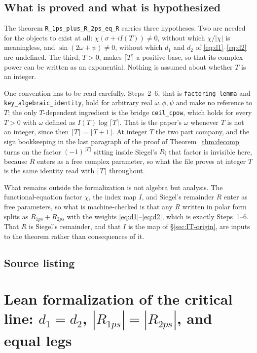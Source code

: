 \documentclass[11pt]{article}
\theoremstyle{definition}
\begin{document}
\subsection{What is proved and what is hypothesized}

The theorem \texttt{R\_1ps\_plus\_R\_2ps\_eq\_R} carries three hypotheses. Two are
needed for the objects to exist at all: $\chi(\sigma+iI(T))\neq0$, without which
$\chi/|\chi|$ is meaningless, and $\sin(2\omega+\psi)\neq0$, without which $d_1$
and $d_2$ of \eqref{eq:d1}--\eqref{eq:d2} are undefined. The third, $T>0$, makes
$\lceil T\rceil$ a positive base, so that its complex power can be written as an
exponential. Nothing is assumed about whether $T$ is an integer.

One convention has to be read carefully. Steps~2--6, that is
\texttt{factoring\_lemma} and \texttt{key\_algebraic\_identity}, hold for
arbitrary real $\omega,\phi,\psi$ and make no reference to $T$; the only
$T$-dependent ingredient is the bridge \texttt{ceil\_cpow}, which holds for every
$T>0$ with $\omega$ defined as $I(T)\log\lceil T\rceil$. That is the paper's
$\omega$ whenever $T$ is not an integer, since then
$\lceil T\rceil=\lfloor T+1\rfloor$. At integer $T$ the two part company, and the
sign bookkeeping in the last paragraph of the proof of
Theorem~\ref{thm:decomp} turns on the factor $(-1)^{\lfloor T\rfloor}$ sitting
inside Siegel's $R$; that factor is invisible here, because $R$ enters as a free
complex parameter, so what the file proves at integer $T$ is the same identity
read with $\lceil T\rceil$ throughout.

What remains outside the formalization is not algebra but analysis. The
functional-equation factor $\chi$, the index map $I$, and Siegel's remainder $R$
enter as free parameters, so what is machine-checked is that any $R$ written in
polar form splits as $R_{1ps}+R_{2ps}$ with the weights
\eqref{eq:d1}--\eqref{eq:d2}, which is exactly Steps~1--6. That $R$ is Siegel's
remainder, and that $I$ is the map of \S\ref{sec:IT-origin}, are inputs to the
theorem rather than consequences of it.

\subsection{Source listing}



\section{Lean formalization of the critical line: \texorpdfstring{$d_1=d_2$, $|R_{1ps}|=|R_{2ps}|$, and equal legs}{d1 = d2, |R1ps| = |R2ps|, and equal legs}}
\label{app:lean-critical}
\end{document}
